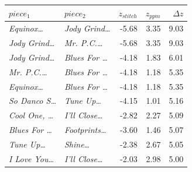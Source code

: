\begin{tabular}{llrrr}
\toprule
$piece_1$ & $piece_2$ & $z_{stitch}$ & $z_{ppm}$ & $\Delta z$ \\
\midrule
\textit{Equinox\dots} & \textit{Jody Grind\dots} & -5.68 & 3.35 & 9.03 \\
\textit{Jody Grind\dots} & \textit{Mr. P.C.\dots} & -5.68 & 3.35 & 9.03 \\
\textit{Jody Grind\dots} & \textit{Blues For \dots} & -4.18 & 1.83 & 6.01 \\
\textit{Mr. P.C.\dots} & \textit{Blues For \dots} & -4.18 & 1.18 & 5.35 \\
\textit{Equinox\dots} & \textit{Blues For \dots} & -4.18 & 1.18 & 5.35 \\
\textit{So Danco S\dots} & \textit{Tune Up\dots} & -4.15 & 1.01 & 5.16 \\
\textit{Cool One, \dots} & \textit{I'll Close\dots} & -2.82 & 2.27 & 5.09 \\
\textit{Blues For \dots} & \textit{Footprints\dots} & -3.60 & 1.46 & 5.07 \\
\textit{Tune Up\dots} & \textit{Shine\dots} & -2.38 & 2.67 & 5.05 \\
\textit{I Love You\dots} & \textit{I'll Close\dots} & -2.03 & 2.98 & 5.00 \\
\bottomrule
\end{tabular}
